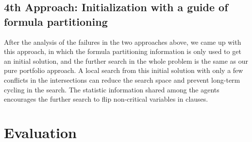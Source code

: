 \documentclass[12pt,a4paper,twoside]{scrartcl}
\numberwithin{equation}{section}
\begin{document}
\subsection{4th Approach: Initialization with a guide of formula partitioning}
\label{sec:4th}
After the analysis of the failures in the two approaches above, we came up with this approach, in which the formula partitioning information is only used to get an initial solution, and the further search in the whole problem is the same as our pure portfolio approach. A local search from this initial solution with only a few conflicts in the intersections can reduce the search space and prevent long-term cycling in the search. The statistic information shared among the agents encourages the further search to flip non-critical variables in clauses. \\

\clearpage
\section{Evaluation} 
\label{sec:eva}
\end{document}
